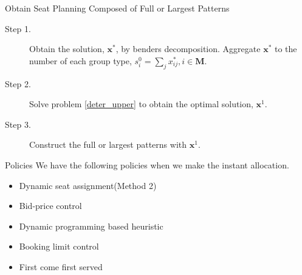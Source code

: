   \begin{frame}{Obtain Seat Planning Composed of Full or Largest Patterns}
    \begin{description}
      \item[Step 1.] Obtain the solution, $\mathbf{x}^{*}$, by benders decomposition. Aggregate $\mathbf{x}^{*}$ to the number of each group type, ${s}_{i}^{0} =\sum_{j} x^{*}_{ij}, i \in \mathbf{M}$.

      \item[Step 2.] Solve problem \eqref{deter_upper} to obtain the optimal solution, $\mathbf{x}^{1}$. 
       
      \item[Step 3.] Construct the full or largest patterns with $\mathbf{x}^{1}$.
   \end{description}
\end{frame}


\begin{frame}{Policies}
  We have the following policies when we make the instant allocation.

  \begin{itemize}
    \item Dynamic seat assignment(Method 2)
    \item Bid-price control
    \item Dynamic programming based heuristic
    \item Booking limit control
    \item First come first served
  \end{itemize}
\end{frame}

